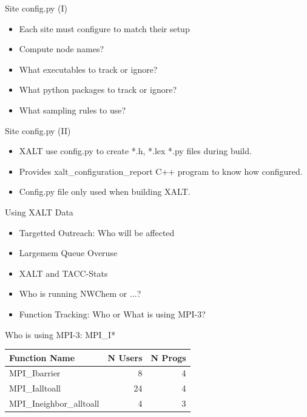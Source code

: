 \documentclass{beamer}
\begin{document}
\begin{frame}{Site config.py (I)}
  \begin{itemize}
    \item Each site must configure to match their setup
    \item Compute node names?
    \item What executables to track or ignore?
    \item What python packages to track or ignore?
    \item What sampling rules to use?
  \end{itemize}
\end{frame}

\begin{frame}{Site config.py (II)}
  \begin{itemize}
    \item XALT use config.py to create *.h, *.lex *.py files during build.
    \item Provides xalt\_configuration\_report C++ program to know how configured.
    \item Config.py file only used when building XALT.
  \end{itemize}
\end{frame}

\begin{frame}{Using XALT Data}
  \begin{itemize}
    \item Targetted Outreach: Who will be affected
    \item Largemem Queue Overuse
    \item XALT and TACC-Stats
    \item Who is running NWChem or ...?
    \item Function Tracking: Who or What is using MPI-3?      
  \end{itemize}
\end{frame}

\begin{frame}{Who is using MPI-3: MPI\_I*}
    \begin{tabular}{|l|r|r|}
        \hline
        Function Name            & N Users    & N Progs \\\hline\hline
        MPI\_Ibarrier            &  8         & 4       \\\hline
        MPI\_Ialltoall           & 24         & 4       \\\hline
        MPI\_Ineighbor\_alltoall &  4         & 3       \\\hline
    \end{tabular}

\end{frame}
\end{document}
